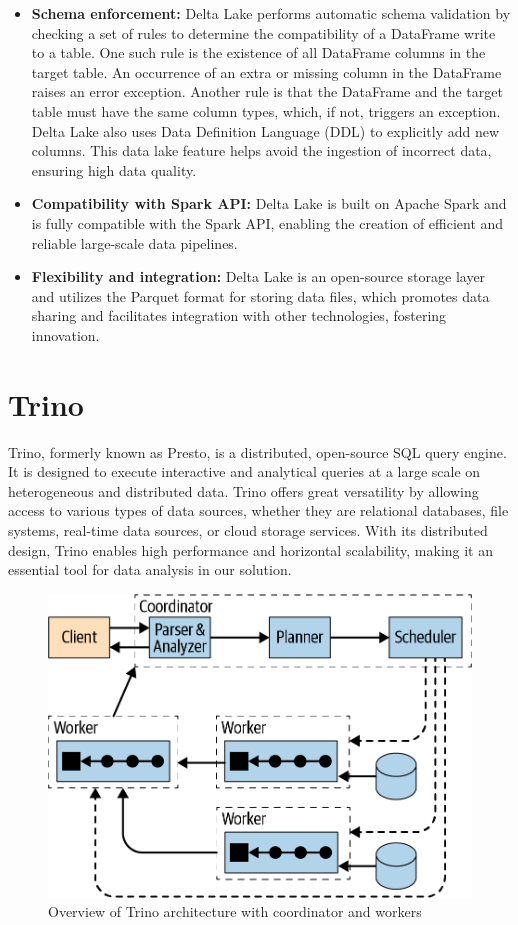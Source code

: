 \begin{itemize}
\item[\textbullet] \textbf{Schema enforcement:} Delta Lake performs automatic schema validation by checking a set of rules to determine the compatibility of a DataFrame write to a table. One such rule is the existence of all DataFrame columns in the target table. An occurrence of an extra or missing column in the DataFrame raises an error exception. Another rule is that the DataFrame and the target table must have the same column types, which, if not, triggers an exception. Delta Lake also uses Data Definition Language (DDL) to explicitly add new columns. This data lake feature helps avoid the ingestion of incorrect data, ensuring high data quality.
\item[\textbullet] \textbf{Compatibility with Spark API:} Delta Lake is built on Apache Spark and is fully compatible with the Spark API, enabling the creation of efficient and reliable large-scale data pipelines.
\item[\textbullet] \textbf{Flexibility and integration:} Delta Lake is an open-source storage layer and utilizes the Parquet format for storing data files, which promotes data sharing and facilitates integration with other technologies, fostering innovation.
\end{itemize}

\section{Trino}

Trino, formerly known as Presto, is a distributed, open-source SQL query engine. It is designed to execute interactive and analytical queries at a large scale on heterogeneous and distributed data. Trino offers great versatility by allowing access to various types of data sources, whether they are relational databases, file systems, real-time data sources, or cloud storage services. With its distributed design, Trino enables high performance and horizontal scalability, making it an essential tool for data analysis in our solution.

\cite{trino}

\begin{figure}[H]
\centering
\includegraphics[width=0.8\linewidth]{images/trino_architecture.png}
\caption{Overview of Trino architecture with coordinator and workers}\label{fig:trino-architecture}
\end{figure}

